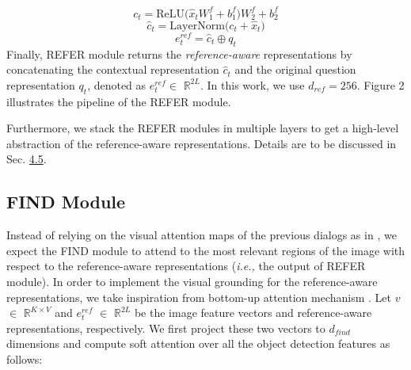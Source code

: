 \documentclass[11pt,a4paper]{article}
\begin{document}
\begin{equation}
    {c_t} = \mathrm{ReLU(} {\hat{x}_t}W_1^f + b_1^f \mathrm{)}W_2^f + b_2^f
\end{equation}
\begin{equation}
    {\hat{c}_t} = \mathrm{LayerNorm(} {c_t} + {\hat{x}_t} \mathrm{)} 
\end{equation}
\begin{equation}
    {e_t^{ref}} = {\hat{c}_t} \oplus {q_t} 
\end{equation}
Finally, REFER module returns the {\it reference-aware} representations by concatenating the contextual representation $\hat{c}_t$ and the original question representation $q_t$, denoted as $e^{ref}_t \in$ $\mathbb{R}^{2L}$. In this work, we use $d_{ref}=256$. Figure 2 illustrates the pipeline of the REFER module.

Furthermore, we stack the REFER modules in multiple layers to get a high-level abstraction of the reference-aware representations. Details are to be discussed in Sec. \hyperref[sec:abl]{4.5}. 

\subsection{FIND Module}
\label{sec:find}
Instead of relying on the visual attention maps of the previous dialogs as in \cite{seo2017visual,kottur2018visual,niu2018recursive}, we expect the FIND module to attend to the most relevant regions of the image with respect to the reference-aware representations ({\it i.e.,} the output of REFER module). In order to implement the visual grounding for the reference-aware representations, we take inspiration from bottom-up attention mechanism \cite{Anderson2017up-down}. Let $v$ $\in$ $\mathbb{R}^{K \times V}$ and $e^{ref}_t$ $\in$ $\mathbb{R}^{2L}$ be the image feature vectors and reference-aware representations, respectively. We first project these two vectors to $d_{find}$ dimensions and compute soft attention over all the object detection features as follows: \\
\end{document}
